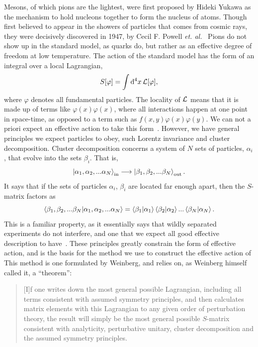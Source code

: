 Mesons, of which pions are the lightest, were first proposed by Hideki Yukawa as the mechanism to hold nucleons together to form the nucleus of atoms.
Though first believed to appear in the showers of particles that comes from cosmic rays, they were decisively discovered in 1947, by Cecil F. Powell \emph{et. al.}~\cite{griffiths:introduction}
Pions do not show up in the standard model, as quarks do, but rather as an effective degree of freedom at low temperature.
The action of the standard model has the form of an integral over a local Lagrangian,
\begin{equation}
    S[\varphi] = \int \dd^4 x \, \mathcal{L}[\varphi],
\end{equation}
where $\varphi$ denotes all fundamental particles.
The locality of $\mathcal{L}$ means that it is made up of terms like $\varphi(x) \varphi(x)$, where all interactions happen at one point in space-time, as opposed to a term such as $f(x, y)\varphi(x) \varphi(y)$.
We can not a priori expect an effective action to take this form~\cite{Schwartz:QFT}.
However, we have general principles we expect particles to obey, such Lorentz invariance and cluster decomposition.
Cluster decomposition concerns a system of $N$ sets of particles, $\alpha_i$, that evolve into the sets $\beta_i$.
That is,
\begin{equation}
    \ket{\alpha_1, \alpha_2, ... \alpha_N}_\text{in}
    \longrightarrow
    \ket{\beta_1, \beta_2, ... \beta_N}_\text{out}.
\end{equation}
It says that if the sets of particles $\alpha_i$, $\beta_i$ are located far enough apart, then the $S$-matrix factors as
\begin{equation}
    {\braket{\beta_1, \beta_2, ... \beta_N}{\alpha_1, \alpha_2, ... \alpha_N}}
    =
    \braket{\beta_1}{\alpha_1}\braket{\beta_2}{\alpha_2}... \braket{\beta_N}{\alpha_N}.
\end{equation}
This is a familiar property, as it essentially says that wildly separated experiments do not interfere, and one that we expect all good effective description to have~\cite{weinberg_1995,weinberg_1996_vol2}.
These principles greatly constrain the form of effective action, and is the basis for the method we use to construct the effective action of \chpt 
This method is one formulated by Weinberg, and relies on, as Weinberg himself called it, a ``theorem'':
\begin{quote}
    [I]f one writes down the most general possible Lagrangian, including all terms consistent with assumed symmetry principles, and then calculates matrix elements with this Lagrangian to any given order of perturbation theory, the result will simply be the most general possible $S$-matrix consistent with analyticity, perturbative unitary, cluster decomposition and the assumed symmetry principles. \cite{WeinbergPhenom}
\end{quote}
